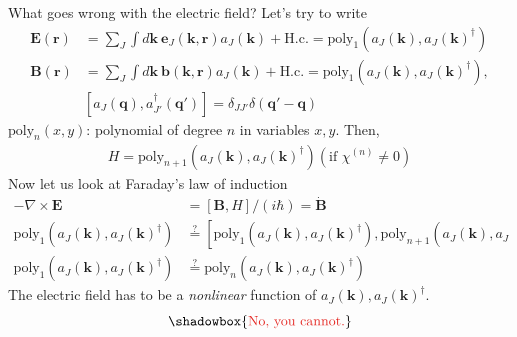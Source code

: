 \documentclass[final]{beamer} %
\begin{document}
\begin{frame}[t]
\begin{columns}[t]
\begin{column}{0.34\paperwidth}
\begin{alertblock}{What goes wrong with the electric field?}
Let's try to write
\begin{align}
\mathbf{E}(\mathbf{r})& = \sum_J \int d{\mathbf{k}} \ \mathbf{e}_J(\mathbf{k},\mathbf{r}) a_{J}(\mathbf{k})+\text{H.c.} = \text{poly}_1(  a_J(\mathbf{k}),  a_J(\mathbf{k})^\dagger)\nonumber\\
\mathbf{B}(\mathbf{r})& = \sum_J \int d{\mathbf{k}} \ \mathbf{b}(\mathbf{k},\mathbf{r}) a_J(\mathbf{k})+\text{H.c.}=\text{poly}_1(  a_J(\mathbf{k}),  a_J(\mathbf{k})^\dagger), \nonumber\\
&[ a_J(\mathbf{q}),  a_{J'}^\dagger(\mathbf{q'})]=\delta_{J J'}\delta(\mathbf{q'}- \mathbf{q}) 
\end{align}
$\text{poly}_n(x,y)$: polynomial of degree $n$ in variables $x,y$. Then,
\begin{align}
H = \text{poly}_{n+1}(  a_J(\mathbf{k}),  a_J(\mathbf{k})^\dagger) (\text{if } \chi^{(n)} \neq 0)
\end{align}
Now let us look at Faraday's law of induction
\begin{align}\label{cont}
-\nabla \times \mathbf{E} &= [\mathbf{B},H] /(i \hbar)= \dot{ \mathbf{B}} \nonumber\\
\text{poly}_1(  a_J(\mathbf{k}),  a_J(\mathbf{k})^\dagger) &\stackrel{?}{=} [ \text{poly}_1(  a_J(\mathbf{k}),  a_J(\mathbf{k})^\dagger), \text{poly}_{n+1}(  a_J(\mathbf{k}),  a_J(\mathbf{k})^\dagger)]\nonumber\\
\text{poly}_1(  a_J(\mathbf{k}),  a_J(\mathbf{k})^\dagger) &\stackrel{?}{=} \text{poly}_n(  a_J(\mathbf{k}),  a_J(\mathbf{k})^\dagger) 
\end{align}
The electric field has to be a \emph{nonlinear} function of $ a_J(\mathbf{k}),  a_J(\mathbf{k})^\dagger $.\\
{\Large
\begin{equation*}
\shadowbox{
\textcolor{redish}{\text{No, you cannot.}}
}
\end{equation*}
}
\end{alertblock}

\end{column}
\end{columns}
\end{frame}
\end{document}
